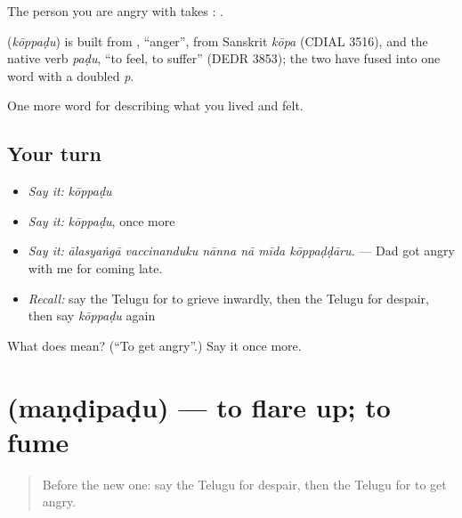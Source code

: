 The person you are angry with takes :   .

\begin{cousinweb}
\textbf{} (\emph{kōppaḍu}) is built from , \textquotedblleft{}anger\textquotedblright{}, from Sanskrit \emph{kōpa} (CDIAL 3516), and the native verb \emph{paḍu}, \textquotedblleft{}to feel, to suffer\textquotedblright{} (DEDR 3853); the two have fused into one word with a doubled \emph{p}.
\end{cousinweb}

\begin{grammarlens}[title={What you've built}]
One more word for describing what you lived and felt.
\end{grammarlens}

\subsection*{Your turn}
\begin{itemize}
\raggedright
  \item \emph{Say it:} \emph{kōppaḍu}
  \item \emph{Say it:} \emph{kōppaḍu}, once more
  \item \emph{Say it:} \emph{ālasyaṅgā vaccinanduku nānna nā mīda kōppaḍḍāru.} — Dad got angry with me for coming late.
  \item \emph{Recall:} say the Telugu for to grieve inwardly, then the Telugu for despair, then say \emph{kōppaḍu} again
\end{itemize}

\begin{tcolorbox}[breakable,colback=teal!4,colframe=teal!35!black,title={Before you move on}]
What does  mean? (\textquotedblleft{}To get angry\textquotedblright{}.) Say it once more.
\end{tcolorbox}
\section[\texorpdfstring{\te{మండిపడు} (maṇḍipaḍu)}{మండిపడు (maṇḍipaḍu)}]{ (maṇḍipaḍu) — to flare up; to fume}

\label{lesson:TE-C497-mandipadu}



\begin{quote}
Before the new one: say the Telugu for despair, then the Telugu for to get angry.
\end{quote}

